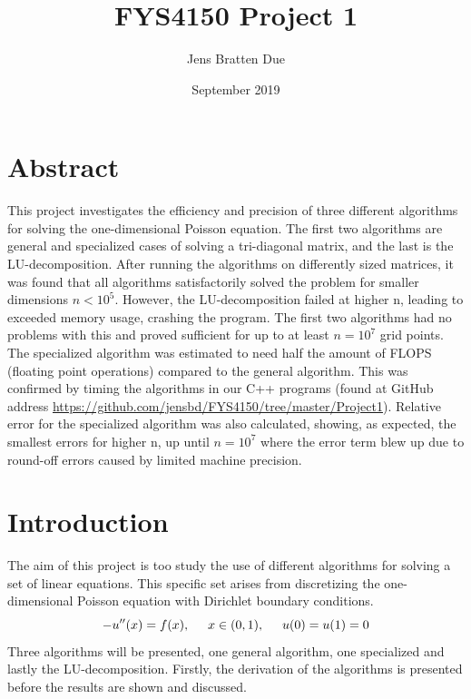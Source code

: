 \documentclass{article}
\title{FYS4150 Project 1}
\author{Jens Bratten Due }
\date{September 2019}
\begin{document}
\maketitle
\section{Abstract}
This project investigates the efficiency and precision of three different algorithms for solving the one-dimensional Poisson equation. The first two algorithms are general and specialized cases of solving a tri-diagonal matrix, and the last is the LU-decomposition. After running the algorithms on differently sized matrices, it was found that all algorithms satisfactorily solved the problem for smaller dimensions $n < 10^5$. However, the LU-decomposition failed at higher n, leading to exceeded memory usage, crashing the program. The first two algorithms had no problems with this and proved sufficient for up to at least $n = 10^7$ grid points. The specialized algorithm was estimated to need half the amount of FLOPS (floating point operations) compared to the general algorithm. This was confirmed by timing the algorithms in our C++ programs (found at GitHub address \url{https://github.com/jensbd/FYS4150/tree/master/Project1}). Relative error for the specialized algorithm was also calculated, showing, as expected, the smallest errors for higher n, up until $n = 10^7$ where the error term blew up due to round-off errors caused by limited machine precision.

\section{Introduction}
The aim of this project is too study the use of different algorithms for solving a set of linear equations. This specific set arises from discretizing the one-dimensional Poisson equation with Dirichlet boundary conditions.
\begin{equation}
    -u''(x) = f(x), \hspace{0.5cm} x\in(0,1), \hspace{0.5cm} u(0) = u(1) = 0
\end{equation}
Three algorithms will be presented, one general algorithm, one specialized and lastly the LU-decomposition.
Firstly, the derivation of the algorithms is presented before the results are shown and discussed. 
\end{document}
